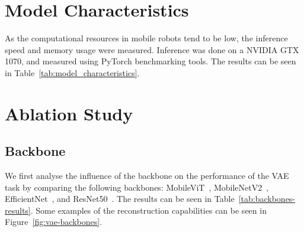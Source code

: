 \section{Model Characteristics}

As the computational resources in mobile robots tend to be low, the inference speed and memory usage were measured. Inference was done on a NVIDIA GTX 1070, and measured using PyTorch benchmarking tools. The results can be seen in Table~\ref{tab:model_characteristics}.




\section{Ablation Study}
\subsection{Backbone}
We first analyse the influence of the backbone on the performance of the VAE task by comparing the following backbones: MobileViT~\cite{Mehta2022SeparableSF}, MobileNetV2~\cite{sandler2019mobilenetv2invertedresidualslinear}, EfficientNet~\cite{tan2020efficientnetrethinkingmodelscaling}, and ResNet50~\cite{he2015deep}. The results can be seen in Table~\ref{tab:backbones-results}. Some examples of the reconstruction capabilities can be seen in Figure~\ref{fig:vae-backbones}.

